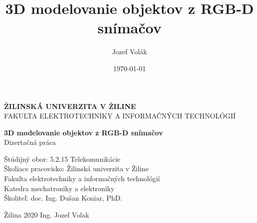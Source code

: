 \documentclass[12pt,oneside,a4paper]{report}
\title{3D modelovanie objektov z RGB-D snímačov}
\author{Jozef Volák}
\date{\today}
\begin{document}
	
	\begin{titlepage}
		\begin{center}
			\Large
			\textbf{ŽILINSKÁ UNIVERZITA V ŽILINE} \\
			\large
			FAKULTA ELEKTROTECHNIKY A INFORMAČNÝCH TECHNOLÓGIÍ \\
		\end{center}	
	
		\vfill
		\begin{center}
		\large
			\textbf{3D modelovanie objektov z RGB-D snímačov} \\
			Dizertačná práca
		\end{center}
		\vfill
	
		\noindent Štúdijný obor: \tabto{4cm} 5.2.15 Telekomunikácie \\
		Školiace pracovisko: \tabto{4cm} Žilinská univerzita v Žiline \\
		\tabto{4cm} Fakulta elektrotechniky a informačných technológií  \\
		\tabto{4cm} Katedra mechatroniky a elektroniky \\
		Školiteľ: \tabto{4cm} doc. Ing. Dušan Koniar, PhD. \\
		\vspace{15px}
		\begin{center}
		Žilina 2020 \hfill Ing. Jozef Volak
		\end{center}
	\end{titlepage}

	\clearpage
	
	
	\setcounter{page}{1} %
	

	\hypersetup{%
		,urlcolor=black
		,citecolor=black
		,linkcolor=black
	}

	\tableofcontents
	
	\hypersetup{%
		,urlcolor=black
		,citecolor=black
		,linkcolor=black
	}


	\clearpage		%
	\printacronyms[include-classes=symbol,name=Zoznam symbolov] %
	\clearpage		%
	\acuseall		%
	\printacronyms[include-classes=abbrev,name=Zoznam skratiek] %
	
\end{document}
